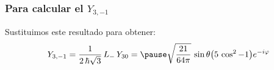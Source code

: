 \documentclass[12pt]{beamer}
\begin{document}
\begin{frame}
\frametitle{Para calcular el $Y_{3,-1}$}
Sustituimos este resultado para obtener:
\pause
\begin{eqnarray*}
Y_{3,-1} = \dfrac{1}{2 \, \hbar \sqrt{3}} \, L_{-} \, Y_{30} = \pause \sqrt{\dfrac{21}{64 \pi}} \, \sin \theta \big( 5 \, \cos^{2} - 1 \big) e^{-i \varphi}
\end{eqnarray*}
\end{frame}    
\end{document}
